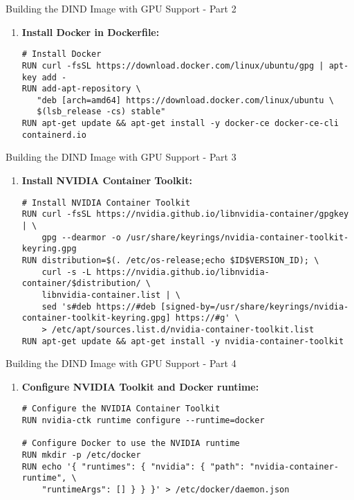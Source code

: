 \documentclass{beamer}
\begin{document}
\begin{frame}[fragile]{Building the DIND Image with GPU Support - Part 2}
    \begin{enumerate}
        \item \textbf{Install Docker in Dockerfile:}
        \tiny %
        \begin{verbatim}
# Install Docker
RUN curl -fsSL https://download.docker.com/linux/ubuntu/gpg | apt-key add -
RUN add-apt-repository \
   "deb [arch=amd64] https://download.docker.com/linux/ubuntu \
   $(lsb_release -cs) stable"
RUN apt-get update && apt-get install -y docker-ce docker-ce-cli containerd.io
        \end{verbatim}
    \end{enumerate}
\end{frame}

\begin{frame}[fragile]{Building the DIND Image with GPU Support - Part 3}
    \begin{enumerate}
        \item \textbf{Install NVIDIA Container Toolkit:}
        \tiny %
        \begin{verbatim}
# Install NVIDIA Container Toolkit
RUN curl -fsSL https://nvidia.github.io/libnvidia-container/gpgkey | \
    gpg --dearmor -o /usr/share/keyrings/nvidia-container-toolkit-keyring.gpg
RUN distribution=$(. /etc/os-release;echo $ID$VERSION_ID); \
    curl -s -L https://nvidia.github.io/libnvidia-container/$distribution/ \
    libnvidia-container.list | \
    sed 's#deb https://#deb [signed-by=/usr/share/keyrings/nvidia-container-toolkit-keyring.gpg] https://#g' \
    > /etc/apt/sources.list.d/nvidia-container-toolkit.list
RUN apt-get update && apt-get install -y nvidia-container-toolkit
        \end{verbatim}
    \end{enumerate}
\end{frame}

\begin{frame}[fragile]{Building the DIND Image with GPU Support - Part 4}
    \begin{enumerate}
        \item \textbf{Configure NVIDIA Toolkit and Docker runtime:}
        \tiny %
        \begin{verbatim}
# Configure the NVIDIA Container Toolkit
RUN nvidia-ctk runtime configure --runtime=docker

# Configure Docker to use the NVIDIA runtime
RUN mkdir -p /etc/docker
RUN echo '{ "runtimes": { "nvidia": { "path": "nvidia-container-runtime", \
    "runtimeArgs": [] } } }' > /etc/docker/daemon.json
        \end{verbatim}
    \end{enumerate}
\end{frame}
\end{document}
